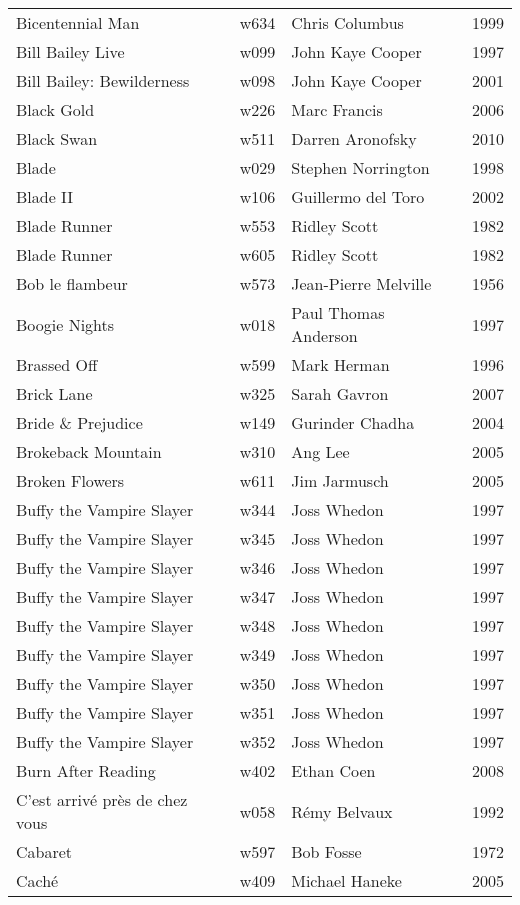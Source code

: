 \documentclass{article}
\begin{document}
\begin {center}
\begin{longtable}{p{10cm} l l l}
Bicentennial Man & w634 & Chris Columbus & 1999 \\
Bill Bailey Live & w099 & John Kaye Cooper & 1997 \\
Bill Bailey: Bewilderness & w098 & John Kaye Cooper & 2001 \\
Black Gold & w226 & Marc Francis & 2006 \\
Black Swan & w511 & Darren Aronofsky & 2010 \\
Blade & w029 & Stephen Norrington & 1998 \\
Blade II & w106 & Guillermo del Toro & 2002 \\
Blade Runner & w553 & Ridley Scott & 1982 \\
Blade Runner & w605 & Ridley Scott & 1982 \\
Bob le flambeur & w573 & Jean-Pierre Melville & 1956 \\
Boogie Nights & w018 & Paul Thomas Anderson & 1997 \\
Brassed Off & w599 & Mark Herman & 1996 \\
Brick Lane & w325 & Sarah Gavron & 2007 \\
Bride \& Prejudice & w149 & Gurinder Chadha & 2004 \\
Brokeback Mountain & w310 & Ang Lee & 2005 \\
Broken Flowers & w611 & Jim Jarmusch & 2005 \\
Buffy the Vampire Slayer & w344 & Joss Whedon & 1997 \\
Buffy the Vampire Slayer & w345 & Joss Whedon & 1997 \\
Buffy the Vampire Slayer & w346 & Joss Whedon & 1997 \\
Buffy the Vampire Slayer & w347 & Joss Whedon & 1997 \\
Buffy the Vampire Slayer & w348 & Joss Whedon & 1997 \\
Buffy the Vampire Slayer & w349 & Joss Whedon & 1997 \\
Buffy the Vampire Slayer & w350 & Joss Whedon & 1997 \\
Buffy the Vampire Slayer & w351 & Joss Whedon & 1997 \\
Buffy the Vampire Slayer & w352 & Joss Whedon & 1997 \\
Burn After Reading & w402 & Ethan Coen & 2008 \\
C'est arrivé près de chez vous & w058 & Rémy Belvaux & 1992 \\
Cabaret & w597 & Bob Fosse & 1972 \\
Caché & w409 & Michael Haneke & 2005 \\

\end{longtable}
\end{center}
\end{document}
